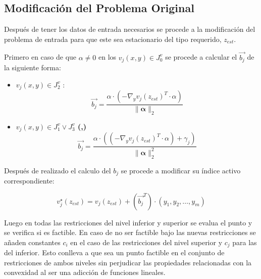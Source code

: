 \subsection{Modificación del Problema Original}
Después de tener los datos de entrada necesarios se procede a la modificación
del problema de entrada para que este sea estacionario del tipo requerido, $z_{est}$.

\begin{samepage}
Primero en caso de que $\alpha \neq 0$ en los $v_j(x,y) \in J_0^v$ se procede a calcular el $\vec{b_j}$ de la siguiente forma:

\begin{itemize}
    \item \textbf{ $v_j(x,y) \in J_2^v$ }:
        \begin{equation}
            \vec{b_j}=  \frac{{\alpha} \cdot (-\nabla_{y}{v_j(z_{est})}^T \cdot \alpha)}{\|\mathbf{\alpha} \|_2}
        \end{equation}
    \item \textbf{$v_j(x,y) \in J_1^v \lor J_3^v$ (,)}\\
    \begin{equation}
        \vec{b_j}=  \frac{{\alpha} \cdot ((-\nabla_{y}{v_j(z_{est})}^T \cdot \alpha)+\gamma_j)}{\|\mathbf{\alpha} \|_2^2}
    \end{equation}
\end{itemize}


Después de realizado el calculo del $b_j$ se procede a modificar su índice activo correspondiente:

\begin{equation}
	v_{j}^{\star}(z_{est})=v_{j}(z_{est})+ ({\vec{b_j}}^T)\cdot (y_1,y_2,\dots,y_m)
\end{equation}
\end{samepage}

Luego en todas las restricciones del nivel inferior y superior
se evalua el punto y se verifica si es factible. En caso de no ser factible 
bajo las nuevas restricciones se añaden constantes $c_i$ en el caso de las restricciones del
nivel superior y $c_j$ para las del inferior. Esto conlleva a que sea un punto factible en el conjunto
de restricciones de ambos niveles sin perjudicar las propiedades relacionadas con la convexidad al ser una adicción
de funciones lineales. 


